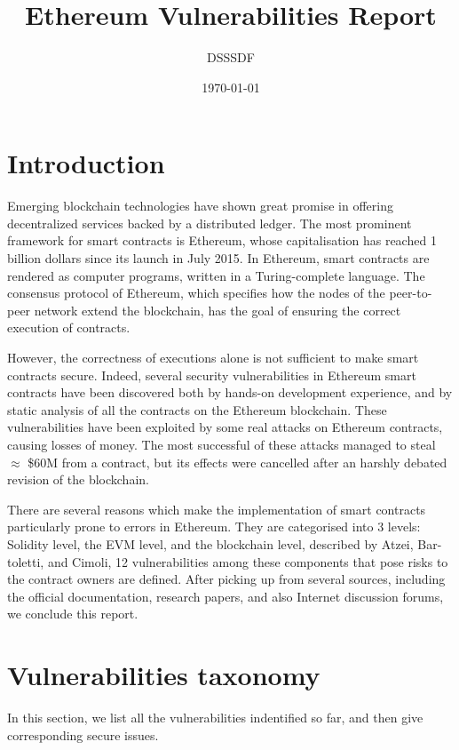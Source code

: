 \documentclass{llncs}
\begin{document}
\title{Ethereum Vulnerabilities Report}
\author{DSSSDF}
\date{\today}
\maketitle

\begin{abstract}

\end{abstract}

\section{Introduction}
Emerging blockchain technologies have shown great promise in offering decentralized services backed by a distributed ledger. The most prominent framework for smart contracts is Ethereum, whose capitalisation has reached 1 billion dollars since its launch in July 2015. In Ethereum, smart contracts are rendered as computer programs, written in a Turing-complete language. The consensus protocol of Ethereum, which specifies how the nodes of the peer-to-peer network extend the blockchain, has the goal of ensuring the correct execution of contracts.

However, the correctness of executions alone is not sufficient to make smart contracts secure. Indeed, several security vulnerabilities in Ethereum smart contracts have been discovered both by hands-on development experience, and by static analysis of all the contracts on the Ethereum blockchain. These
vulnerabilities have been exploited by some real attacks on Ethereum contracts, causing losses of money. The most successful of these attacks managed to steal $ \approx $ \$60M from a contract, but its effects were cancelled after an harshly debated revision of the blockchain.

There are several reasons which make the implementation of smart contracts particularly prone to errors in Ethereum. They are categorised into 3 levels: Solidity level, the EVM level, and the
blockchain level, described by Atzei, Bar-toletti, and Cimoli, 12 vulnerabilities among these components that pose risks to the contract owners are defined. After picking up from several sources, including the official documentation, research papers, and also Internet discussion forums, we conclude this report.

\section{Vulnerabilities taxonomy}
In this section, we list all the vulnerabilities indentified so far, and then give corresponding secure issues.
\end{document}
